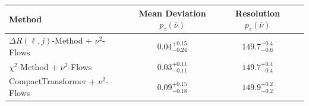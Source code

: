     \begin{tabular}{lccc}
        \toprule
        Method & Mean Deviation $p_{z}(\bar{\nu})$ & Resolution $p_{z}(\bar{\nu})$ \\
        \midrule
        $\Delta R(\ell,j)$-Method + $\nu^2$-Flows & $0.04^{+0.15}_{-0.24}$ & $149.7^{+0.4}_{-0.6}$ \\
        $\chi^2$-Method + $\nu^2$-Flows & $0.03^{+0.11}_{-0.11}$ & $149.7^{+0.4}_{-0.4}$ \\
        CompactTransformer + $\nu^2$-Flows & $0.09^{+0.15}_{-0.18}$ & $149.9^{+0.2}_{-0.2}$ \\
        \bottomrule
    \end{tabular}